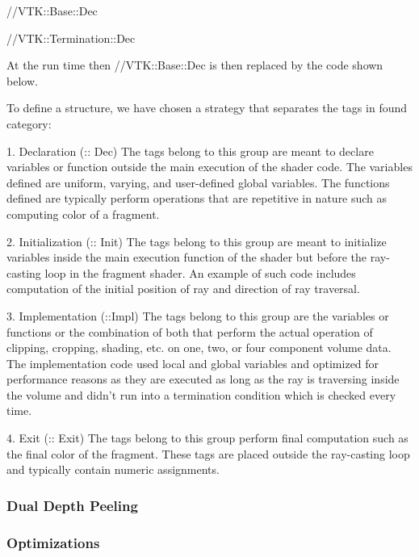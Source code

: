 //VTK::Base::Dec

//VTK::Termination::Dec 

At the run time then //VTK::Base::Dec is then replaced by the code shown below. 

To define a structure, we have chosen a strategy that separates the tags in found category: 

1. Declaration (:: Dec)
The tags belong to this group are meant to declare variables or function outside the main execution of the shader code. The variables defined are uniform, varying, and user-defined global variables. The functions defined are typically perform operations that are repetitive in nature such as computing color of a fragment. 

2. Initialization (:: Init)
The tags belong to this group are meant to initialize variables inside the main execution function of the shader but before the ray-casting loop in the fragment shader. An example of such code includes computation of the initial position of ray and direction of ray traversal.

3. Implementation (::Impl)
The tags belong to this group are the variables or functions or the combination of both that perform the actual operation of clipping, cropping, shading, etc. on one, two, or four component volume data. The implementation code used local and global variables and optimized for performance reasons as they are executed as long as the ray is traversing inside the volume and didn't run into a termination condition which is checked every time.  

4. Exit (:: Exit)
The tags belong to this group perform final computation such as the final color of the fragment. These tags are placed outside the ray-casting loop and typically contain numeric assignments.


 
 \subsubsection{Dual Depth Peeling}
 
 
 \subsubsection{Optimizations}
